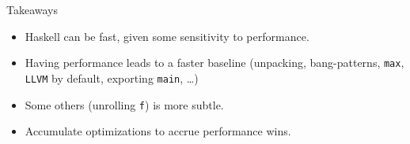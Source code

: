 \documentclass[8pt]{beamer}
\begin{document}
\begin{frame}[fragile]{Takeaways}
\begin{itemize}
\item Haskell can be fast, given some sensitivity to performance.
\item Having performance leads to a faster baseline
      (unpacking, bang-patterns, \texttt{max},
      \texttt{LLVM} by default, exporting \texttt{main}, \dots)
\item Some others (unrolling \texttt{f}) is more subtle.
\item Accumulate optimizations to accrue performance wins.
\end{itemize}
\end{frame}
\end{document}
